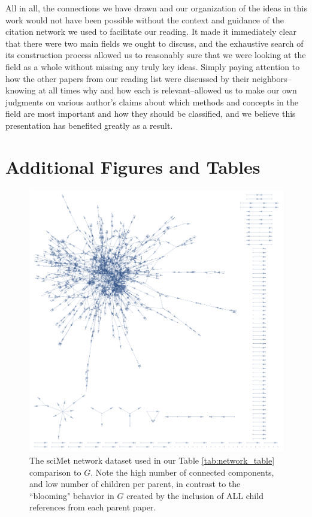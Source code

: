 \documentclass[12pt]{thesis}
\theoremstyle{plain}
\theoremstyle{definition}
\theoremstyle{remark}
\begin{document}
All in all, the connections we have drawn and our organization of the ideas in this work would not have been possible without the context and guidance of the citation network we used to facilitate our reading. It made it immediately clear that there were two main fields we ought to discuss, and the exhaustive search of its construction process allowed us to reasonably sure that we were looking at the field as a whole without missing any truly key ideas. Simply paying attention to how the other papers from our reading list were discussed by their neighbors--knowing at all times why and how each is relevant--allowed us to make our own judgments on various author's claims about which methods and concepts in the field are most important and how they should be classified, and we believe this presentation has benefited greatly as a result.





\appendix
\chapter{Additional Figures and Tables}\label{chapter:appendices}

\begin{figure}[H]
\centering
\includegraphics[width=\textwidth]{display_sciMet.png}
\caption{The sciMet network dataset used in our Table \ref{tab:network_table} comparison to $G$. Note the high number of connected components, and low number of children per parent, in contrast to the ``blooming" behavior in $G$ created by the inclusion of ALL child references from each parent paper.}
\label{fig:sciMet}
\end{figure}
\end{document}
